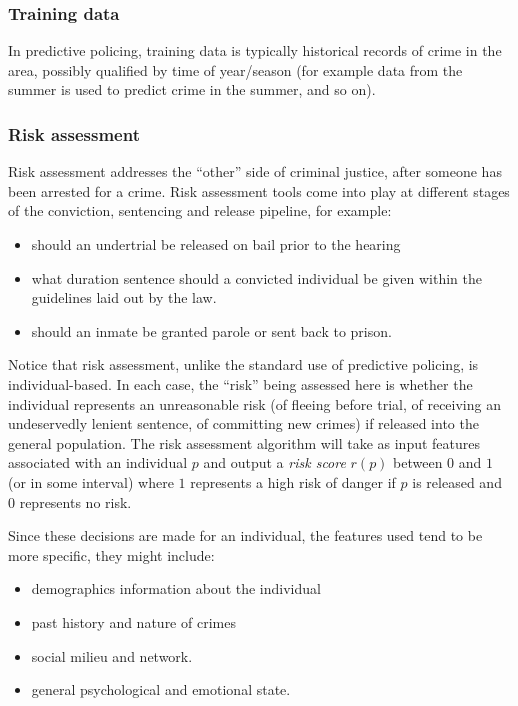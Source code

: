 \documentclass[11pt]{paper}
\begin{document}
\subsubsection{Training data}\label{training-data}

In predictive policing, training data is typically historical records of
crime in the area, possibly qualified by time of year/season (for
example data from the summer is used to predict crime in the summer, and
so on).

\subsubsection{Risk assessment}\label{risk-assessment}

Risk assessment addresses the ``other'' side of criminal justice, after
someone has been arrested for a crime. Risk assessment tools come into
play at different stages of the conviction, sentencing and release
pipeline, for example:

\begin{itemize}
\itemsep1pt\parskip0pt
\item
  should an undertrial be released on bail prior to the hearing
\item
  what duration sentence should a convicted individual be given within
  the guidelines laid out by the law.
\item
  should an inmate be granted parole or sent back to prison.
\end{itemize}

Notice that risk assessment, unlike the standard use of predictive
policing, is individual-based. In each case, the ``risk'' being assessed
here is whether the individual represents an unreasonable risk (of
fleeing before trial, of receiving an undeservedly lenient sentence, of
committing new crimes) if released into the general population. The risk
assessment algorithm will take as input features associated with an
individual $p$ and output a \emph{risk score} $r(p)$ between $0$ and $1$
(or in some interval) where $1$ represents a high risk of danger if $p$
is released and $0$ represents no risk.

Since these decisions are made for an individual, the features used tend
to be more specific, they might include:

\begin{itemize}
\itemsep1pt\parskip0pt
\item
  demographics information about the individual
\item
  past history and nature of crimes
\item
  social milieu and network.
\item
  general psychological and emotional state.
\end{itemize}
\end{document}
